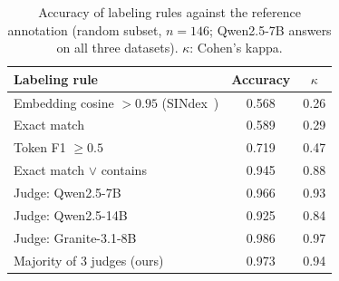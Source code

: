 \begin{table}[t]\centering
\caption{Accuracy of labeling rules against the reference annotation (random subset, $n=146$; Qwen2.5-7B answers on all three datasets). $\kappa$: Cohen's kappa.}
\label{tab:labels}\small\setlength{\tabcolsep}{4pt}
\begin{tabular}{lcc}\toprule
Labeling rule & Accuracy & $\kappa$\\\midrule
Embedding cosine $>0.95$ (SINdex~\cite{abdaljalil2026sindex}) & 0.568 & 0.26\\
Exact match & 0.589 & 0.29\\
Token F1 $\ge 0.5$ & 0.719 & 0.47\\
Exact match $\lor$ contains & 0.945 & 0.88\\
Judge: Qwen2.5-7B & 0.966 & 0.93\\
Judge: Qwen2.5-14B & 0.925 & 0.84\\
Judge: Granite-3.1-8B & 0.986 & 0.97\\
Majority of 3 judges (ours) & 0.973 & 0.94\\
\bottomrule\end{tabular}\end{table}